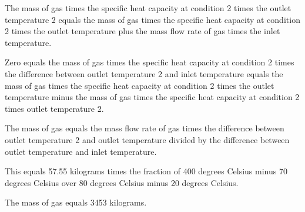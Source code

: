 The mass of gas times the specific heat capacity at condition 2 times the outlet temperature 2 equals the mass of gas times the specific heat capacity at condition 2 times the outlet temperature plus the mass flow rate of gas times the inlet temperature.

Zero equals the mass of gas times the specific heat capacity at condition 2 times the difference between outlet temperature 2 and inlet temperature equals the mass of gas times the specific heat capacity at condition 2 times the outlet temperature minus the mass of gas times the specific heat capacity at condition 2 times outlet temperature 2.

The mass of gas equals the mass flow rate of gas times the difference between outlet temperature 2 and outlet temperature divided by the difference between outlet temperature and inlet temperature.

This equals 57.55 kilograms times the fraction of 400 degrees Celsius minus 70 degrees Celsius over 80 degrees Celsius minus 20 degrees Celsius.

The mass of gas equals 3453 kilograms.